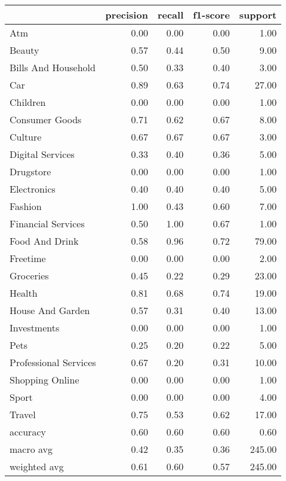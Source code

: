 \begin{tabular}{lrrrr}
\toprule
{} &  precision &  recall &  f1-score &  support \\
\midrule
Atm                   &       0.00 &    0.00 &      0.00 &     1.00 \\
Beauty                &       0.57 &    0.44 &      0.50 &     9.00 \\
Bills And Household   &       0.50 &    0.33 &      0.40 &     3.00 \\
Car                   &       0.89 &    0.63 &      0.74 &    27.00 \\
Children              &       0.00 &    0.00 &      0.00 &     1.00 \\
Consumer Goods        &       0.71 &    0.62 &      0.67 &     8.00 \\
Culture               &       0.67 &    0.67 &      0.67 &     3.00 \\
Digital Services      &       0.33 &    0.40 &      0.36 &     5.00 \\
Drugstore             &       0.00 &    0.00 &      0.00 &     1.00 \\
Electronics           &       0.40 &    0.40 &      0.40 &     5.00 \\
Fashion               &       1.00 &    0.43 &      0.60 &     7.00 \\
Financial Services    &       0.50 &    1.00 &      0.67 &     1.00 \\
Food And Drink        &       0.58 &    0.96 &      0.72 &    79.00 \\
Freetime              &       0.00 &    0.00 &      0.00 &     2.00 \\
Groceries             &       0.45 &    0.22 &      0.29 &    23.00 \\
Health                &       0.81 &    0.68 &      0.74 &    19.00 \\
House And Garden      &       0.57 &    0.31 &      0.40 &    13.00 \\
Investments           &       0.00 &    0.00 &      0.00 &     1.00 \\
Pets                  &       0.25 &    0.20 &      0.22 &     5.00 \\
Professional Services &       0.67 &    0.20 &      0.31 &    10.00 \\
Shopping Online       &       0.00 &    0.00 &      0.00 &     1.00 \\
Sport                 &       0.00 &    0.00 &      0.00 &     4.00 \\
Travel                &       0.75 &    0.53 &      0.62 &    17.00 \\
accuracy              &       0.60 &    0.60 &      0.60 &     0.60 \\
macro avg             &       0.42 &    0.35 &      0.36 &   245.00 \\
weighted avg          &       0.61 &    0.60 &      0.57 &   245.00 \\
\bottomrule
\end{tabular}

